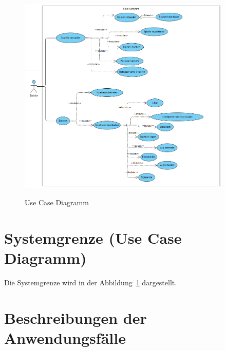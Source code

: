 \begin{figure}
\centering	
\includegraphics[width=0.9\textwidth]{img/ucd06.png}
\label{fig:sys}
\caption{Use Case Diagramm}
\end{figure}

\section{Systemgrenze (Use Case Diagramm)}

Die Systemgrenze wird in der Abbildung~\ref{fig:sys} dargestellt. 


\section{Beschreibungen der Anwendungsfälle}


\setcounter{uc}{10}

